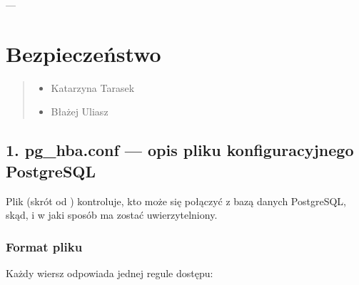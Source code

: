\documentclass[a4paper,11pt,openany,english]{sphinxmanual}
\begin{document}
\sphinxAtStartPar
—

\sphinxstepscope


\section{Bezpieczeństwo}
\label{\detokenize{rozdzial2/Bezpieczenstwo/index:bezpieczenstwo}}\label{\detokenize{rozdzial2/Bezpieczenstwo/index::doc}}\begin{quote}\begin{description}
\begin{itemize}
\item {} 
\sphinxAtStartPar
Katarzyna Tarasek

\item {} 
\sphinxAtStartPar
Błażej Uliasz

\end{itemize}

\end{description}\end{quote}


\subsection{1. pg\_hba.conf — opis pliku konfiguracyjnego PostgreSQL}
\label{\detokenize{rozdzial2/Bezpieczenstwo/index:pg-hba-conf-opis-pliku-konfiguracyjnego-postgresql}}
\sphinxAtStartPar
Plik  (skrót od ) kontroluje, kto może się połączyć z bazą danych PostgreSQL, skąd, i w jaki sposób ma zostać uwierzytelniony.


\subsubsection{Format pliku}
\label{\detokenize{rozdzial2/Bezpieczenstwo/index:format-pliku}}
\sphinxAtStartPar
Każdy wiersz odpowiada jednej regule dostępu:

\begin{sphinxVerbatim}[commandchars=\\\{\}]
           \PYG{p}{[}\PYG{p}{]}
\end{sphinxVerbatim}
\end{document}
